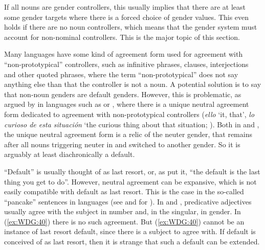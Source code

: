 \documentclass[output=collectionpaper]{langsci/langscibook}
\begin{document}
If all nouns are gender controllers, this usually implies that there are at least some gender targets where there is a forced choice of gender values. This even holds if there are no noun controllers, which means that the gender system must account for non-nominal controllers. This is the major topic of this section.

Many languages have some kind of  agreement form used for agreement with ``non-prototypical'' controllers, such as infinitive phrases, clauses, interjections and other quoted phrases, where the term ``non-prototypical'' does not say anything else than that the controller is not a noun. A potential solution is to say that non-noun genders are default genders. However, this is problematic, as argued by \cite[214]{Corbett1991} in languages such as  or , where there is a unique neutral agreement form dedicated to agreement with non-prototypical controllers (\textit{ello} `it, that', \textit{lo curioso de esta situación} `the curious thing about that situation; \citealt[214--215]{Corbett1991}). Both in  and , the unique neutral agreement form is a relic of the neuter gender, that remains after all nouns triggering neuter in  and  switched to another gender. So it is arguably at least diachronically a default.

``Default'' is usually thought of as last resort, or, as \cite[71]{CorbettFraser1999} put it, ``the default is the last thing you get to do''. However, neutral agreement can be expansive, which is not easily compatible with default as last resort. This is the case in the so-called ``pancake'' sentences in  languages (see \citealt{Faarlund1977} and \citealt{Enger2004} for ). In  and , predicative adjectives usually agree with the subject in number and, in the singular, in gender. In (\ref{ex:WDG:40}) there is no such agreement. But (\ref{ex:WDG:40}) cannot be an instance of last resort default, since there is a subject to agree with. If default is conceived of as last resort, then it is strange that such a default can be extended.

%
\end{document}
